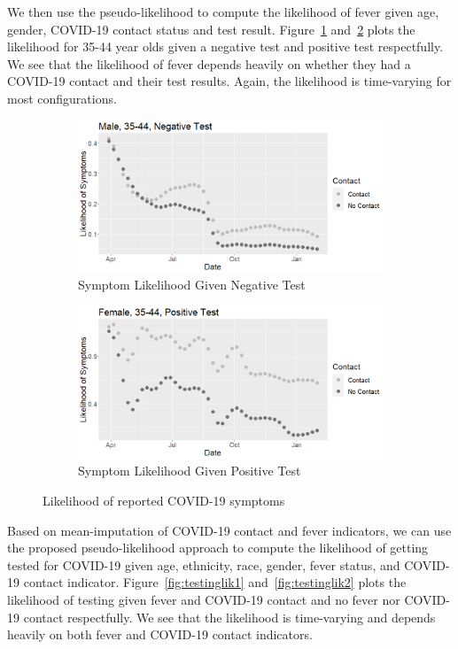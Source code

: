 \documentclass[11pt]{amsart}
\numberwithin{equation}{section}
\theoremstyle{plain}
\begin{document}
We then use the pseudo-likelihood to compute the likelihood of fever given age, gender, COVID-19 contact status and test result.  Figure~\ref{fig:symptomlik1} and~\ref{fig:symptomlik2} plots the likelihood for 35-44 year olds given a negative test and positive test respectfully.  We see that the likelihood of fever depends heavily on whether they had a COVID-19 contact and their test results. Again, the likelihood is time-varying for most configurations.


\begin{figure}[!th]
\centering
\begin{subfigure}{.5\textwidth}
 \centering
 \includegraphics[width=.9\linewidth]{../figs/tvprop_symptom_fig1.png}
 \caption{Symptom Likelihood Given Negative Test}
 \label{fig:symptomlik1}
\end{subfigure}%
\begin{subfigure}{.5\textwidth}
 \centering
\includegraphics[width=.9\linewidth]{../figs/tvprop_symptom_fig2.png}
 \caption{Symptom Likelihood Given Positive Test}
 \label{fig:symptomlik2}
\end{subfigure}
\caption{Likelihood of reported COVID-19 symptoms}
\label{fig:symptomlik}
\end{figure}

Based on mean-imputation of COVID-19 contact and fever indicators, we can use the proposed pseudo-likelihood approach to compute the likelihood of getting tested for COVID-19 given age, ethnicity, race, gender, fever status, and COVID-19 contact indicator.  Figure~\ref{fig:testinglik1} and~\ref{fig:testinglik2} plots the likelihood of testing given fever and COVID-19 contact and no fever nor COVID-19 contact respectfully.  We see that the likelihood is time-varying and depends heavily on both fever and COVID-19 contact indicators.
\end{document}
